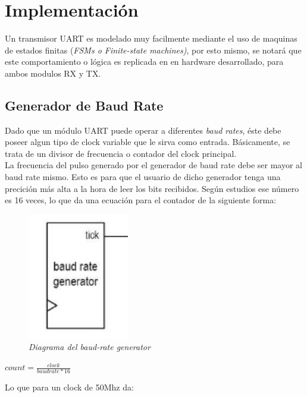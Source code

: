\documentclass{article}
\begin{document}
\section{Implementación}
Un transmisor UART es modelado muy facilmente mediante el uso de maquinas de estados finitas (\textit{FSMs o Finite-state machines)},
por esto mismo, se notará que este comportamiento o lógica es replicada en en hardware desarrollado, para ambos modulos RX y TX. \\

\subsection{Generador de Baud Rate}
\indent Dado que un módulo UART puede operar a diferentes \textit{baud rates}, éste debe poseer algun tipo de clock variable que le 
sirva como entrada. Básicamente, se trata de un divisor de frecuencia o contador del clock principal. \\
\indent La frecuencia del pulso generado por el generador de baud rate debe ser mayor al baud rate mismo. Esto es para que
el usuario de dicho generador tenga una precición más alta a la hora de leer los bits recibidos. Según estudios ese número es
16 veces, lo que da una ecuación para el contador de la siguiente forma: \\

\begin{figure}[H]
    \begin{center}
        \includegraphics[scale=0.5]{baudrategenerator}
        \caption{\textit{Diagrama del baud-rate generator}}
    \end{center}
\end{figure}

\begin{center}
    $ count = \frac{clock}{baudrate * 16} $
\end{center}

Lo que para un clock de 50Mhz da:
\end{document}
